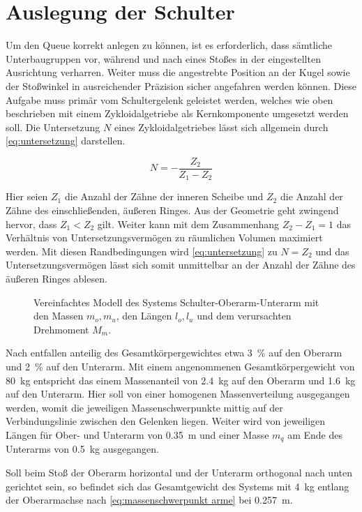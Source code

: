 	\section{Auslegung der Schulter}\label{sec:auslegung}

	Um den Queue korrekt anlegen zu können, ist es erforderlich, dass sämtliche Unterbaugruppen vor, während und nach eines Stoßes in der eingestellten Ausrichtung verharren.
	Weiter muss die angestrebte Position an der Kugel sowie der Stoßwinkel in ausreichender Präzision sicher angefahren werden können.
	Diese Aufgabe muss primär vom Schultergelenk geleistet werden, welches wie oben beschrieben mit einem Zykloidalgetriebe \cite{Lee.2020} \cite{Jang.2021} als Kernkomponente umgesetzt werden soll.
	Die Untersetzung \(N\) eines Zykloidalgetriebes lässt sich allgemein durch \cref{eq:untersetzung} darstellen.

	\begin{equation}
		N = -\frac{Z_2}{Z_1 - Z_2}%
		\label{eq:untersetzung}
	\end{equation}

	Hier seien \(Z_1\) die Anzahl der Zähne der inneren Scheibe und \(Z_2\) die Anzahl der Zähne des einschließenden, äußeren Ringes.
	Aus der Geometrie geht zwingend hervor, dass \(Z_1 < Z_2\) gilt.
	Weiter kann mit dem Zusammenhang \(Z_2 - Z_1 = 1\) das Verhältnis von Untersetzungsvermögen zu räumlichen Volumen maximiert werden.
	Mit diesen Randbedingungen wird \cref{eq:untersetzung} zu \(N = Z_2\) und das Untersetzungsvermögen lässt sich somit unmittelbar an der Anzahl der Zähne des äußeren Ringes ablesen.

		\begin{figure}[h]
			\centering
			
			\caption[Vereinfachtes Modell des Systems Schulter-Oberarm-Unterarm]{Vereinfachtes Modell des Systems Schulter-Oberarm-Unterarm mit den Massen \(m_o, m_u\), den Längen \(l_o, l_u\) und dem verursachten Drehmoment \(M_m\).}%
			\label{fig:modell schulter oberarm unterarm}
		\end{figure}
		
		Nach \cite{Soll.1982} entfallen anteilig des Gesamtkörpergewichtes etwa \SI{3}{\percent} auf den Oberarm und \SI{2}{\percent} auf den Unterarm.
		Mit einem angenommenen Gesamtkörpergewicht von \SI{80}{\kilo\gram} entspricht das einem Massenanteil von \SI{2,4}{\kilo\gram} auf den Oberarm und \SI{1,6}{\kilo\gram} auf den Unterarm.
		Hier soll von einer homogenen Massenverteilung ausgegangen werden, womit die jeweiligen Massenschwerpunkte mittig auf der Verbindungslinie zwischen den Gelenken liegen.
		Weiter wird von jeweiligen Längen für Ober- und Unterarm von \SI{0,35}{\metre} und einer Masse \(m_q\) am Ende des Unterarms von \SI{0,5}{\kilo\gram} ausgegangen.\par
		Soll beim Stoß der Oberarm horizontal und der Unterarm orthogonal nach unten gerichtet sein, so befindet sich das Gesamtgewicht des Systems mit \SI{4}{\kilo\gram} entlang der Oberarmachse nach \cref{eq:massenschwerpunkt arme} bei \SI{0,257}{\metre}.

